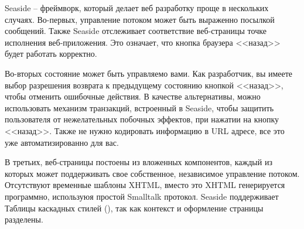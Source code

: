 \documentclass[a4paper,10pt,twoside]{book}
\begin{document}


Seaside -- фреймворк, который делает веб разработку проще в нескольких случаях.
Во-первых, управление потоком может быть выраженно посылкой сообщений.
Также Seaside отслеживает соответствие веб-страницы точке исполнения веб-приложения.
Это означает, что кнопка браузера <<назад>> будет работать корректно.



Во-вторых состояние может быть управляемо вами.
Как разработчик, вы имеете выбор разрешения возврата к предыдущему состоянию кнопкой <<назад>>, чтобы отменить ошибочные действия.
В качестве альтернативы, можно использовать механизм транзакций, встроенный в Seaside,
чтобы защитить пользователя от нежелательных побочных эффектов, при нажатии на кнопку <<назад>>.
Также не нужно кодировать информацию в URL адресе, все это уже автоматизированно для вас.



В третьих, веб-страницы постоены из вложенных компонентов,
каждый из которых может поддерживать свое собственное,
независимое управление потоком.
Отсутствуют временные шаблоны XHTML,
вместо это XHTML генерируется программно,
используюя простой Smalltalk протокол.
Seaside поддерживает Таблицы каскадных стилей (), так как контекст и оформление страницы разделены.
\end{document}
